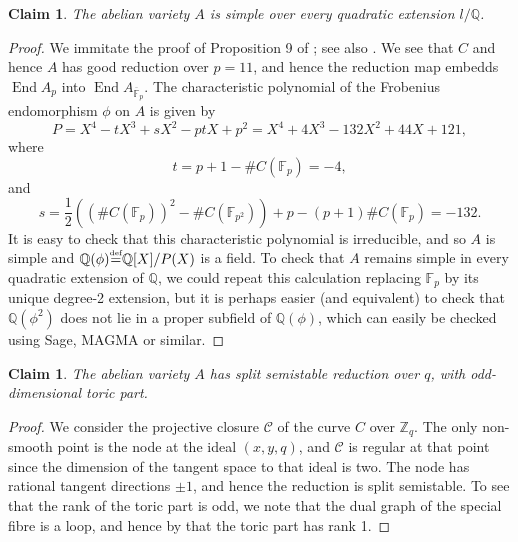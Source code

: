 \documentclass[a4paper,12pt]{amsart}
\newtheorem{claim}[definition]{Claim}
\begin{document}
\begin{claim}\label{claim:simple}
The abelian variety $A$ is simple over every quadratic extension $l/{{\mathbb Q}}$. 
\end{claim}
\begin{proof}
We immitate the proof of Proposition 9 of \cite{FlynnPoononSchaefer}; see also \cite{stoll1996example}. We see that $C$ and hence $A$ has good reduction over $p=11$, and hence the reduction map embedds ${\operatorname{End}} A_{p}$ into ${\operatorname{End}} A_{\overline{{\mathbb F}}_{p}}$. The characteristic polynomial of the Frobenius endomorphism $\phi$ on $A$ is given by
\begin{equation}
P = X^{4} - tX^{3} + sX^{2} - ptX + p^{2} = X^4 + 4X^3 - 132X^2 + 44X + 121, 
\end{equation}
where
\begin{equation}
t = p + 1 - \#C({{\mathbb F}}_{p}) = -4, 
\end{equation}
and
\begin{equation}
s = \frac{1}{2}((\#C({{\mathbb F}}_{p}))^{2} - \#C({{\mathbb F}}_{p^{2}})) +p -(p+1)\#C({{\mathbb F}}_{p}) = -132. 
\end{equation}
It is easy to check that this characteristic polynomial is irreducible, and so $A$ is simple and ${{\mathbb Q}}(\phi) {\stackrel{\text{\tiny def}}{=}} {{\mathbb Q}}[X]/P(X)$ is a field. To check that $A$ remains simple in every quadratic extension of ${{\mathbb Q}}$, we could repeat this calculation replacing ${{\mathbb F}}_{p}$ by its unique degree-2 extension, but it is perhaps easier (and equivalent) to check that ${{\mathbb Q}}(\phi^{2})$ does not lie in a proper subfield of ${{\mathbb Q}}(\phi)$, which can easily be checked using Sage, MAGMA or similar. 
\end{proof}

\begin{claim}
The abelian variety $A$ has split semistable reduction over $q$, with odd-dimensional toric part. 
\end{claim}
\begin{proof}
We consider the projective closure ${{\mathcal C}}$ of the curve $C$ over ${{\mathbb Z}}_q$. 
The only non-smooth point is the node at the ideal $(x,y,q)$, and ${{\mathcal C}}$ is regular at that point since the dimension of the tangent space to that ideal is two. The node has rational tangent directions $\pm 1$, and hence the reduction is split semistable. To see that the rank of the toric part is odd, we note that the dual graph of the special fibre is a loop, and hence by \cite[Chapter 9, Example 8, Page 246]{bosch1990neron} that the toric part has rank 1. 
\end{proof}
\end{document}
